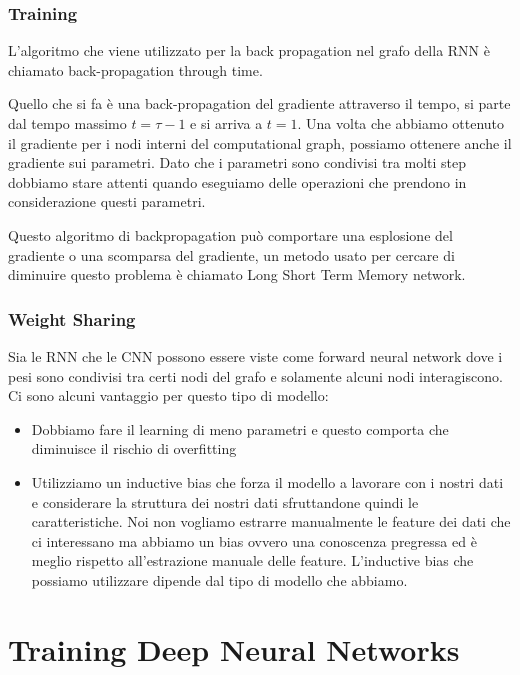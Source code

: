 \documentclass[14pt]{extreport}
\begin{document}
\subsubsection{Training}

L'algoritmo che viene utilizzato per la back propagation nel grafo della RNN è chiamato back-propagation through time.

Quello che si fa è una back-propagation del gradiente attraverso il tempo, si parte dal tempo massimo $t=\tau - 1$ e si arriva a $t=1$. Una volta che
abbiamo ottenuto il gradiente per i nodi interni del computational graph, possiamo ottenere anche il gradiente sui parametri. Dato che i parametri
sono condivisi tra molti step dobbiamo stare attenti quando eseguiamo delle operazioni che prendono in considerazione questi parametri.

Questo algoritmo di backpropagation può comportare una esplosione del gradiente o una scomparsa del gradiente, un metodo usato per cercare di
diminuire questo problema è chiamato Long Short Term Memory network.

\subsubsection{Weight Sharing}

Sia le RNN che le CNN possono essere viste come forward neural network dove i pesi sono condivisi tra certi nodi del grafo e solamente alcuni nodi
interagiscono. Ci sono alcuni vantaggio per questo tipo di modello:
\begin{itemize}
	\item Dobbiamo fare il learning di meno parametri e questo comporta che diminuisce il rischio di overfitting
	\item Utilizziamo un inductive bias che forza il modello a lavorare con i nostri dati e considerare la struttura dei nostri dati sfruttandone
	      quindi le caratteristiche. Noi non vogliamo estrarre manualmente le feature dei dati che ci interessano ma abbiamo un bias ovvero una
	      conoscenza pregressa ed è meglio rispetto all'estrazione manuale delle feature. L'inductive bias che possiamo utilizzare dipende dal tipo di
	      modello che abbiamo.
\end{itemize}


\section{Training Deep Neural Networks}
\end{document}
